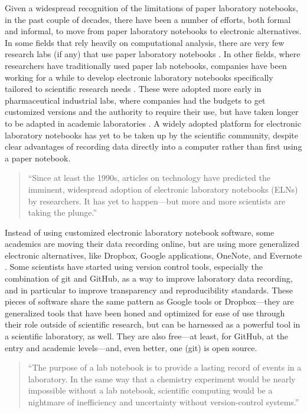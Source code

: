 \documentclass[]{tufte-book}
\begin{document}
Given a widespread recognition of the limitations of paper laboratory notebooks,
in the past couple of decades, there have been a number of efforts, both formal
and informal, to move from paper laboratory notebooks to electronic
alternatives. In some fields that rely heavily on computational analysis, there
are very few research labs (if any) that use paper laboratory notebooks
\citep{butler2005electronic}. In other fields, where researchers have traditionally
used paper lab notebooks, companies have been working for a while to develop
electronic laboratory notebooks specifically tailored to scientific research
needs \citep{giles2012digital}. These were adopted more early in pharmaceutical
industrial labs, where companies had the budgets to get customized versions and
the authority to require their use, but have taken longer to be adapted in
academic laboratories \citep{giles2012digital, butler2005electronic}. A widely
adopted platform for electronic laboratory notebooks has yet to be taken up
by the scientific community, despite clear advantages of recording data directly
into a computer rather than first using a paper notebook.

\begin{quote}
``Since at least the 1990s, articles on technology have predicted the imminent,
widespread adoption of electronic laboratory notebooks (ELNs) by researchers. It has
yet to happen---but more and more scientists are taking the plunge.'' \citep{kwok2018lab}
\end{quote}

Instead of using customized electronic laboratory notebook software, some
academics are moving their data recording online, but are using more generalized
electronic alternatives, like Dropbox, Google applications, OneNote, and
Evernote \citep{perkel2011coding, kwok2018lab, giles2012digital, powell2012lab}.
Some scientists have started using version control tools, especially the
combination of git and GitHub, as a way to improve laboratory data recording,
and in particular to improve transparency and reproducibility standards.
These pieces of software share the same pattern as Google tools or
Dropbox---they are generalized tools that have been honed and optimized for ease
of use through their role outside of scientific research, but can be harnessed
as a powerful tool in a scientific laboratory, as well. They are also free---at
least, for GitHub, at the entry and academic levels---and, even better, one
(git) is open source.

\begin{quote}
``The purpose of a lab notebook is to provide a lasting record of events in a
laboratory. In the same way that a chemistry experiment would be nearly
impossible without a lab notebook, scientific computing would be a nightmare of
inefficiency and uncertainty without version-control systems.''
\citep{tippmannmy2014digital}
\end{quote}
\end{document}
